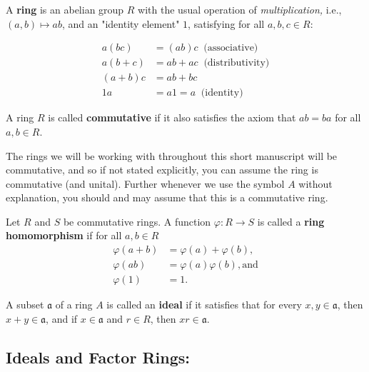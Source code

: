 \documentclass[graybox, reqno]{svmono}
\newcommand{\ideala}{\mathfrak{a}}
\begin{document}
\begin{definition}
A \textbf{ring} is an abelian group $R$ with the usual operation of \textit{multiplication,} i.e., $(a, b) \mapsto ab$, and an "identity element" $1$, satisfying for all $a, b, c \in R$:

\begin{align*}
a(bc) &= (ab)c \; \; \text{(associative)} \\
a(b+c) &= ab + ac \; \; \text{(distributivity)} \\ 
(a+b)c &= ab + bc\\
1a &= a1 = a \; \; \text{(identity)}
\end{align*}
\end{definition}

\begin{definition} A ring $R$ is called \textbf{commutative} if it also satisfies the axiom that $ab = ba$ for all $a, b \in R$. 
\end{definition}


The rings we will be working with throughout this short manuscript will be commutative, and so if not stated explicitly, you can assume the ring is commutative (and unital). Further whenever we use the symbol $A$ without explanation, you should and may assume that this is a commutative ring. 

\begin{definition} Let $R$ and $S$ be commutative rings. A function $\varphi \colon R \to S$ is called a \textup{\textbf{ring homomorphism}} if for all $a, b \in R$
\begin{align*}
\varphi(a+b) &= \varphi(a) + \varphi(b), \\
\varphi(ab) &= \varphi(a) \varphi(b), \text{and} \\
\varphi (1) &= 1.
\end{align*}
\end{definition}

A subset $\ideala$ of a ring $A$ is called an \textbf{ideal} if it satisfies that for every $x, y\in \ideala$, then $x+y \in \ideala$, and if $x \in \ideala$ and $r \in R$, then $xr \in \ideala$. 
\subsection{Ideals and Factor Rings:}
\end{document}
